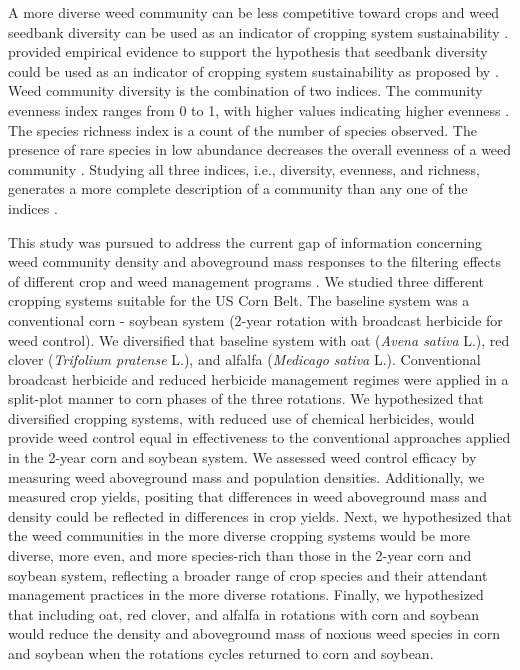 \documentclass[
]{article}
\begin{document}
A more diverse weed community can be less competitive toward crops and weed seedbank diversity can be used as an indicator of cropping system sustainability \citep{storkeyWhatGoodWeed2018}. \citet{liebmanWeedSeedbankDiversity2021} provided empirical evidence to support the hypothesis that seedbank diversity could be used as an indicator of cropping system sustainability as proposed by \citet{storkeyWhatGoodWeed2018}. Weed community diversity is the combination of two indices. The community evenness index ranges from 0 to 1, with higher values indicating higher evenness \citep{alataloProblemsMeasurementEvenness1981}. The species richness index is a count of the number of species observed. The presence of rare species in low abundance decreases the overall evenness of a weed community \citep{pielouInterpretationEcologicalData1984, stirlingEmpiricalRelationshipsSpecies2001}. Studying all three indices, i.e., diversity, evenness, and richness, generates a more complete description of a community than any one of the indices \citep{morrisChoosingUsingDiversity2014}.

This study was pursued to address the current gap of information concerning weed community density and aboveground mass responses to the filtering effects of different crop and weed management programs \citep{ryanManagementFiltersSpecies2010, friedTrajectoriesWeedCommunities2012}. We studied three different cropping systems suitable for the US Corn Belt. The baseline system was a conventional corn - soybean system (2-year rotation with broadcast herbicide for weed control). We diversified that baseline system with oat (\emph{Avena sativa} L.), red clover (\emph{Trifolium pratense} L.), and alfalfa (\emph{Medicago sativa} L.). Conventional broadcast herbicide and reduced herbicide management regimes were applied in a split-plot manner to corn phases of the three rotations. We hypothesized that diversified cropping systems, with reduced use of chemical herbicides, would provide weed control equal in effectiveness to the conventional approaches applied in the 2-year corn and soybean system. We assessed weed control efficacy by measuring weed aboveground mass and population densities. Additionally, we measured crop yields, positing that differences in weed aboveground mass and density could be reflected in differences in crop yields. Next, we hypothesized that the weed communities in the more diverse cropping systems would be more diverse, more even, and more species-rich than those in the 2-year corn and soybean system, reflecting a broader range of crop species and their attendant management practices in the more diverse rotations. Finally, we hypothesized that including oat, red clover, and alfalfa in rotations with corn and soybean would reduce the density and aboveground mass of noxious weed species in corn and soybean when the rotations cycles returned to corn and soybean.
\end{document}

